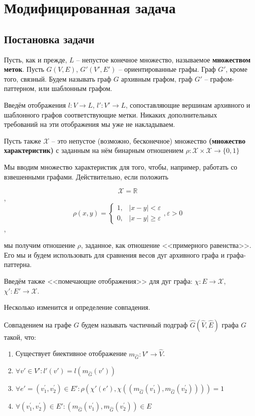 \section{Модифицированная задача}

\subsection{Постановка задачи}
\par Пусть, как и прежде, $L$ -- непустое конечное множество, называемое \textbf{множеством меток}. Пусть $G(V, E)$, $G'(V', E')$ -- ориентированные графы. Граф $G'$, кроме того, связный. Будем называть граф $G$ архивным графом, граф $G'$ -- графом-паттерном, или шаблонным графом.

Введём отображения $l : V \to L$, $l' : V' \to L$, сопоставляющие вершинам архивного и шаблонного графов соответствующие метки. Никаких дополнительных требований на эти отображения мы уже не накладываем.

Пусть также $\mathcal{X}$ -- это непустое (возможно, бесконечное) множество \textbf{(множество характеристик)} с заданным на нём бинарным отношением $\rho:\mathcal{X} \times \mathcal{X} \to \{0, 1\}$

Мы вводим множество характеристик для того, чтобы, например, работать со взвешенными графами. Действительно, если положить 

\[\mathcal{X} = \mathbb{R}\], 
\[\rho(x, y) = \begin{cases}
1, & |x - y| < \varepsilon \\
0, & |x - y| \ge \varepsilon
\end{cases}, \varepsilon > 0\],

мы получим отношение $\rho$, заданное, как отношение <<примерного равенства>>. Его мы и будем использовать для сравнения весов дуг архивного графа и графа-паттерна.

Введём также <<помечающие отображения>> для дуг графа: $\chi : E \to \mathcal{X}$, $\chi' : E' \to \mathcal{X}$.

Несколько изменится и определение совпадения.

\begin{defn}
	Совпадением на графе $G$ будем называть частичный подграф $\widehat{G}(\widehat{V}, \widehat{E})$ графа $G$ такой, что:
	\begin{enumerate}
		\item Существует биективное отображение $m_{\widehat{G}}: V' \to \widehat{V}$.
		\item $\forall v' \in V': l'(v') = l(m_{\widehat{G}}(v'))$
		\item $\forall e' = (v^{\prime}_1, v^{\prime}_2) \in E': \rho(\chi'(e'), \chi((m_{\widehat{G}}(v^{\prime}_1), m_{\widehat{G}}(v^{\prime}_2)))) = 1$
		\item $\forall (v^{\prime}_1, v^{\prime}_2) \in E': (m_{\widehat{G}}(v^{\prime}_1), m_{\widehat{G}}(v^{\prime}_2)) \in E$
	\end{enumerate}
\end{defn} 

